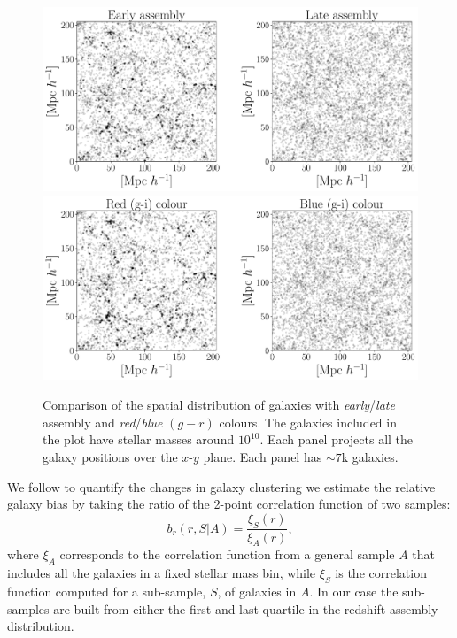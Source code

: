 \documentclass{aa}
\begin{document}
\begin{figure}
    \centering
    \includegraphics[width=1.8\columnwidth]{figuras/scatter_assembly.pdf}
    \includegraphics[width=1.8\columnwidth]{figuras/scatter_color.pdf}
    \caption{Comparison of the spatial distribution of galaxies with 
      \emph{early}/\emph{late} assembly and \emph{red}/\emph{blue}
      $(g-r)$ colours.
      The galaxies included in the plot have stellar masses around
      $10^{10}$\Msunh.  
      Each panel projects all the galaxy positions over the $x$-$y$
      plane.  
    Each panel has $\sim7$k galaxies. }
    \label{fig:comparison}
\end{figure}


We follow \cite{2020MNRAS.tmp.1844M} to quantify the changes in galaxy
clustering we estimate the relative galaxy bias by taking the ratio of
the 2-point correlation function of two samples: 
%
\begin{equation}
b_r(r, S|A)= \frac{\xi_S(r)}{\xi_A(r)}, 
\label{eq:relative}
\end{equation}
%
where $\xi_A$ corresponds to the correlation function from a general
sample $A$ that includes all the galaxies in a fixed stellar mass bin,
while $\xi_S$ is the correlation function computed for a sub-sample,
$S$, of galaxies in $A$. 
In our case the sub-samples are built from either the first and last
quartile in the redshift assembly distribution. 
\end{document}
